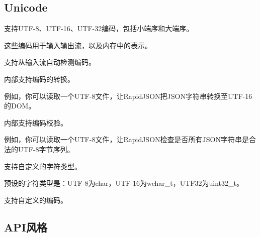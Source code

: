 \subsection*{Unicode}


\begin{DoxyItemize}
\item 支持\+U\+T\+F-\/8、\+U\+T\+F-\/16、\+U\+T\+F-\/32编码，包括小端序和大端序。
\begin{DoxyItemize}
\item 这些编码用于输入输出流，以及内存中的表示。
\end{DoxyItemize}
\item 支持从输入流自动检测编码。
\item 内部支持编码的转换。
\begin{DoxyItemize}
\item 例如，你可以读取一个\+U\+T\+F-\/8文件，让\+Rapid\+J\+S\+O\+N把\+J\+S\+O\+N字符串转换至\+U\+T\+F-\/16的\+D\+O\+M。
\end{DoxyItemize}
\item 内部支持编码校验。
\begin{DoxyItemize}
\item 例如，你可以读取一个\+U\+T\+F-\/8文件，让\+Rapid\+J\+S\+O\+N检查是否所有\+J\+S\+O\+N字符串是合法的\+U\+T\+F-\/8字节序列。
\end{DoxyItemize}
\item 支持自定义的字符类型。
\begin{DoxyItemize}
\item 预设的字符类型是：\+U\+T\+F-\/8为{\ttfamily char}，\+U\+T\+F-\/16为{\ttfamily wchar\+\_\+t}，\+U\+T\+F32为{\ttfamily uint32\+\_\+t}。
\end{DoxyItemize}
\item 支持自定义的编码。
\end{DoxyItemize}

\subsection*{A\+P\+I风格}


